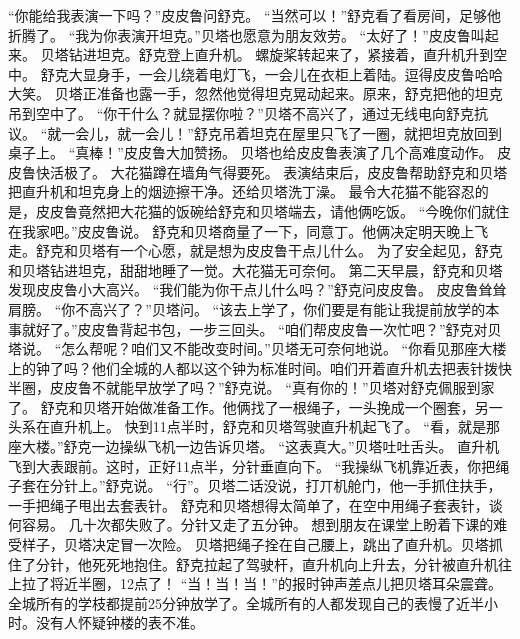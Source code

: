 \documentclass[a4paper,12pt,UTF8,twoside]{ctexbook}
\begin{document}
        “你能给我表演一下吗？”皮皮鲁问舒克。 
        “当然可以！”舒克看了看房间，足够他折腾了。 
        “我为你表演开坦克。”贝塔也愿意为朋友效劳。 
        “太好了！”皮皮鲁叫起来。 
        贝塔钻进坦克。舒克登上直升机。 
        螺旋桨转起来了，紧接着，直升机升到空中。 
        舒克大显身手，一会儿绕着电灯飞，一会儿在衣柜上着陆。逗得皮皮鲁哈哈大笑。 
        贝塔正准备也露一手，忽然他觉得坦克晃动起来。原来，舒克把他的坦克吊到空中了。 
        “你干什么？就显摆你啦？”贝塔不高兴了，通过无线电向舒克抗议。 
        “就一会儿，就一会儿！”舒克吊着坦克在屋里只飞了一圈，就把坦克放回到桌子上。 
        “真棒！”皮皮鲁大加赞扬。 
        贝塔也给皮皮鲁表演了几个高难度动作。 
        皮皮鲁快活极了。 
        大花猫蹲在墙角气得要死。 
        表演结束后，皮皮鲁帮助舒克和贝塔把直升机和坦克身上的烟迹擦干净。还给贝塔洗丁澡。 
        最令大花猫不能容忍的是，皮皮鲁竟然把大花猫的饭碗给舒克和贝塔端去，请他俩吃饭。 
        “今晚你们就住在我家吧。”皮皮鲁说。 
        舒克和贝塔商量了一下，同意丁。他俩决定明天晚上飞走。舒克和贝塔有一个心愿，就是想为皮皮鲁干点儿什么。 
        为了安全起见，舒克和贝塔钻进坦克，甜甜地睡了一觉。大花猫无可奈何。 
        第二天早晨，舒克和贝塔发现皮皮鲁小大高兴。 
        “我们能为你干点儿什么吗？”舒克问皮皮鲁。 
        皮皮鲁耸耸肩膀。 
        “你不高兴了？”贝塔问。 
        “该去上学了，你们要是有能让我提前放学的本事就好了。”皮皮鲁背起书包，一步三回头。 
        “咱们帮皮皮鲁一次忙吧？”舒克对贝塔说。 
        “怎么帮呢？咱们又不能改变时间。”贝塔无可奈何地说。 
        “你看见那座大楼上的钟了吗？他们全城的人都以这个钟为标准时间。咱们开着直升机去把表针拨快半圈，皮皮鲁不就能早放学了吗？”舒克说。 
        “真有你的！”贝塔对舒克佩服到家了。 
        舒克和贝塔开始做准备工作。他俩找了一根绳子，一头挽成一个圈套，另一头系在直升机上。 
        快到11点半时，舒克和贝塔驾驶直升机起飞了。 
        “看，就是那座大楼。”舒克一边操纵飞机一边告诉贝塔。 
        “这表真大。”贝塔吐吐舌头。 
        直升机飞到大表跟前。这时，正好11点半，分针垂直向下。 
        “我操纵飞机靠近表，你把绳子套在分针上。”舒克说。 
        “行”。贝塔二话没说，打丌机舱门，他一手抓住扶手，一手把绳子甩出去套表针。 
        舒克和贝塔想得太简单了，在空中用绳子套表针，谈何容易。 
        几十次都失败了。分针又走了五分钟。 
        想到朋友在课堂上盼着下课的难受样子，贝塔决定冒一次险。 
        贝塔把绳子拴在自己腰上，跳出了直升机。贝塔抓住了分针，他死死地抱住。舒克拉起了驾驶杆，直升机向上升去，分针被直升机往上拉了将近半圈，12点了！ 
        “当！当！当！”的报时钟声差点儿把贝塔耳朵震聋。 
        全城所有的学枝都提前25分钟放学了。全城所有的人都发现自己的表慢了近半小时。没有人怀疑钟楼的表不准。 
\end{document}
